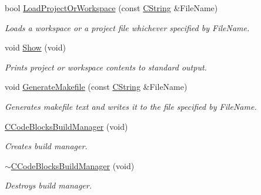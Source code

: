 \begin{DoxyCompactItemize}
bool \hyperlink{classCCodeBlocksBuildManager_a8f8b8006d89c5ec7b93fa76c6b57a9ff}{Load\-Project\-Or\-Workspace} (const \hyperlink{classCString}{C\-String} \&File\-Name)
\begin{DoxyCompactList}\small\item\em Loads a workspace or a project file whichever specified by {\itshape File\-Name}. \end{DoxyCompactList}\item 
void \hyperlink{classCCodeBlocksBuildManager_a034a2188dd52d4cbe3300e396aef41c4}{Show} (void)
\begin{DoxyCompactList}\small\item\em Prints project or workspace contents to standard output. \end{DoxyCompactList}\item 
void \hyperlink{classCCodeBlocksBuildManager_ae755f758024134bfc2d123d78f647391}{Generate\-Makefile} (const \hyperlink{classCString}{C\-String} \&File\-Name)
\begin{DoxyCompactList}\small\item\em Generates makefile text and writes it to the file specified by {\itshape File\-Name}. \end{DoxyCompactList}\item 
\hyperlink{classCCodeBlocksBuildManager_a6699fe49e0787e4bb04876b42a2e2ddd}{C\-Code\-Blocks\-Build\-Manager} (void)
\begin{DoxyCompactList}\small\item\em Creates build manager. \end{DoxyCompactList}\item 
\hyperlink{classCCodeBlocksBuildManager_adfff912964320d1e282d06687fae5120}{$\sim$\-C\-Code\-Blocks\-Build\-Manager} (void)
\begin{DoxyCompactList}\small\item\em Destroys build manager. \end{DoxyCompactList}\end{DoxyCompactItemize}
